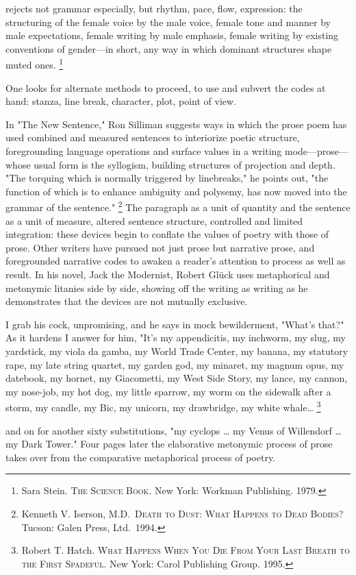 \documentclass[
]{memoir}
\begin{document}
rejects not grammar especially, but rhythm, pace, flow, expression: the
structuring of the female voice by the male voice, female tone and
manner by male expectations, female writing by male emphasis, female
writing by existing conventions of gender---in short, any way in which
dominant structures shape muted ones. \footnote{Sara Stein. \textsc{The
  Science Book}. New York: Workman Publishing. 1979.}

One looks for alternate methods to proceed, to use and subvert the codes
at hand: stanza, line break, character, plot, point of view.

In "The New Sentence," Ron Silliman suggests ways in which the prose
poem has used combined and measured sentences to interiorize poetic
structure, foregrounding language operations and surface values in a
writing mode---prose---whose usual form is the syllogism, building
structures of projection and depth. "The torquing which is normally
triggered by linebreaks," he points out, "the function of which is to
enhance ambiguity and polysemy, has now moved into the grammar of the
sentence." \footnote{Kenneth V. Iserson, M.D.~\textsc{Death to Dust:
  What Happens to Dead Bodies?} Tucson: Galen Press, Ltd.~1994.} The
paragraph as a unit of quantity and the sentence as a unit of measure,
altered sentence structure, controlled and limited integration: these
devices begin to conflate the values of poetry with those of prose.
Other writers have pursued not just prose but narrative prose, and
foregrounded narrative codes to awaken a reader's attention to process
as well as result. In his novel, Jack the Modernist, Robert Glück uses
metaphorical and metonymic litanies side by side, showing off the
writing as writing as he demonstrates that the devices are not mutually
exclusive.

I grab his cock, unpromising, and he says in mock bewilderment, "What's
that?" As it hardens I answer for him, "It's my appendicitis, my
inchworm, my slug, my yardstick, my viola da gamba, my World Trade
Center, my banana, my statutory rape, my late string quartet, my garden
god, my minaret, my magnum opus, my datebook, my hornet, my Giacometti,
my West Side Story, my lance, my cannon, my nose-job, my hot dog, my
little sparrow, my worm on the sidewalk after a storm, my candle, my
Bic, my unicorn, my drawbridge, my white whale\ldots{} \footnote{Robert
  T. Hatch. \textsc{What Happens When You Die From Your Last Breath to
  the First Spadeful}. New York: Carol Publishing Group. 1995.}

and on for another sixty substitutions, "my cyclops \ldots{} my Venus of
Willendorf \ldots{} my Dark Tower." Four pages later the elaborative
metonymic process of prose takes over from the comparative metaphorical
process of poetry.
\end{document}
